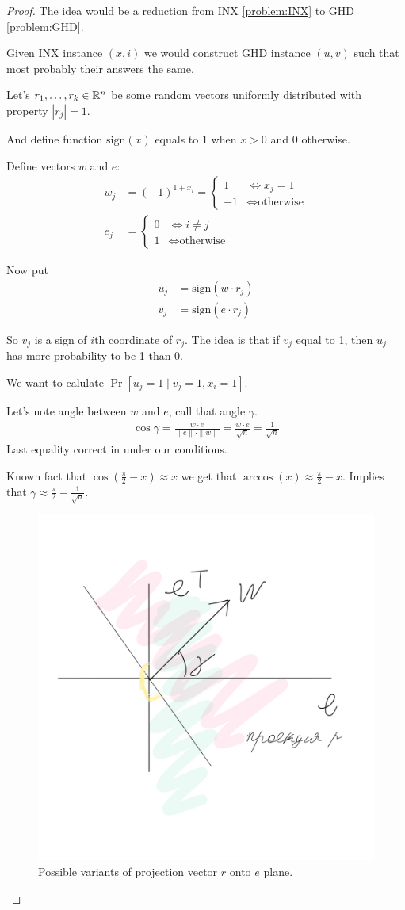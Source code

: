 \begin{proof}
	The idea would be a reduction from INX \ref{problem:INX} to GHD \ref{problem:GHD}.
	
	Given INX instance $(x, i)$ we would construct GHD instance $(u, v)$ such that most probably their answers the same.
	
	Let's $r_1, \ldots, r_k \in \mathbb{R}^n$ be some random vectors uniformly distributed with property $| r_j|  = 1$.
	
	And define function $\text{sign}(x)$ equals to 1 when $x > 0$ and 0 otherwise.
	
	Define vectors $w$ and $e$:
	\begin{align*}
		w_j &= (-1)^{1 + x_j} = \begin{cases}
			1 &\iff x_j = 1 \\
			-1 &\iff \text{otherwise}
		\end{cases} \\
		e_j &= \begin{cases}
			0 &\iff i \neq j \\
			1 &\iff \text{otherwise}
		\end{cases}
	\end{align*}
	
	Now put
	\begin{align*}
		u_j &= \text{sign}(w \cdot r_j) \\
		v_j &= \text{sign}(e \cdot r_j)
	\end{align*}
	
	So $v_j$ is a sign of $i$th coordinate of $r_j$.
	The idea is that if $v_j$ equal to 1, then $u_j$ has more probability to be 1 than 0. 
	
	We want to calulate $\Pr[u_j = 1 \mid v_j = 1, x_i = 1]$.
	
	Let's note angle between $w$ and $e$, call that angle $\gamma$.
	\begin{align*}
		\cos \gamma = \frac{w \cdot e}{\|e\| \cdot \|w\|} =\frac {w \cdot e} {\sqrt n} = \frac 1 {\sqrt n}
	\end{align*}
	Last equality correct in under our conditions.
	
	Known fact that $\cos(\frac \pi 2 - x) \approx x$ we get that $\arccos(x) \approx \frac \pi 2 - x$.
	Implies that $\gamma \approx \frac \pi 2 - \frac{1}{\sqrt n}$.

	
	\begin{figure}[H]
		\centering
		\includegraphics[width=0.4\linewidth]{figures/proof_ghd_projection.jpeg}
		\caption{Possible variants of projection vector $r$ onto $e$ plane.}
		\label{fig:proof_ghd_projection}
	\end{figure}
	

\end{proof}
